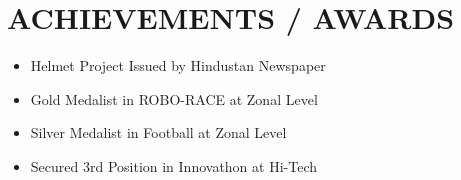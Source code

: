 \documentclass[letterpaper,11pt]{article}
\newcommand{\resumeItem}[1]{
  \item\small{
    {#1 \vspace{-2pt}}
  }
}
\newcommand{\resumeSubHeadingListStart}{\begin{itemize}[leftmargin=0.0in, label={}]}
\newcommand{\resumeSubHeadingListEnd}{\end{itemize}}
\begin{document}
\section{ACHIEVEMENTS / AWARDS}
        \begin{multicols}{2}
            \begin{itemize}[itemsep=-2pt, parsep=5pt]
                \resumeItem{\normalsize{Helmet Project Issued by Hindustan Newspaper \href{https://hindi.news18.com/news/uttar-pradesh/moradabad-mit-college-students-babar-hussain-and-divyanshu-sharma-have-made-a-smart-helmet-5532387.html}{\raisebox{-0.1\height}\faExternalLink }}}
                \resumeItem{\normalsize{Gold Medalist in ROBO-RACE at Zonal Level \href{https://drive.google.com/file/d/1YG-kfLePw1qpBEg_bDl5fii0_hZHTH80/view}{\raisebox{-0.1\height}\faExternalLink }}}
                \resumeItem{\normalsize{Silver Medalist in Football at Zonal Level \href{https://drive.google.com/file/d/1Y4upLAHcpI4jQNDh5IlbcTRanINk-Ydm/view}{\raisebox{-0.1\height}\faExternalLink }}}
                \resumeItem{\normalsize{Secured 3rd Position in Innovathon at Hi-Tech \href{https://drive.google.com/file/d/1XuymnyKmI0in9ikZXJmr9R58yhU3zhwt/view}{\raisebox{-0.1\height}\faExternalLink }}} 
                 
            \end{itemize}
        \end{multicols}
        \vspace*{-2.0\multicolsep}



\end{document}
